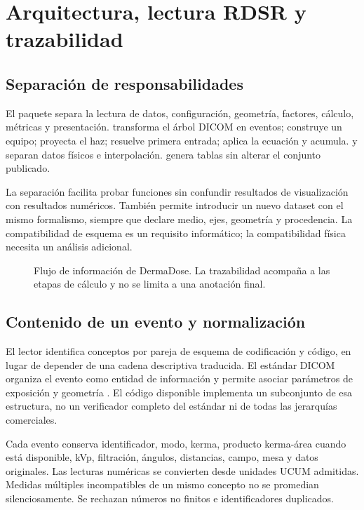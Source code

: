 \chapter{Arquitectura, lectura RDSR y trazabilidad}
\section{Separación de responsabilidades}
El paquete separa la lectura de datos, configuración, geometría, factores, cálculo, métricas y presentación.  transforma el árbol DICOM en eventos;  construye un equipo;  proyecta el haz;  resuelve primera entrada;  aplica la ecuación y acumula.  y  separan datos físicos e interpolación.  genera tablas sin alterar el conjunto publicado.

La separación facilita probar funciones sin confundir resultados de visualización con resultados numéricos. También permite introducir un nuevo dataset con el mismo formalismo, siempre que declare medio, ejes, geometría y procedencia. La compatibilidad de esquema es un requisito informático; la compatibilidad física necesita un análisis adicional.
\begin{figure}[htbp]\centering
\caption{Flujo de información de DermaDose. La trazabilidad acompaña a las etapas de cálculo y no se limita a una anotación final.}\end{figure}

\section{Contenido de un evento y normalización}
El lector identifica conceptos por pareja de esquema de codificación y código, en lugar de depender de una cadena descriptiva traducida. El estándar DICOM organiza el evento como entidad de información y permite asociar parámetros de exposición y geometría \citep{dicom}. El código disponible implementa un subconjunto de esa estructura, no un verificador completo del estándar ni de todas las jerarquías comerciales.

Cada evento conserva identificador, modo, kerma, producto kerma-área cuando está disponible, kVp, filtración, ángulos, distancias, campo, mesa y datos originales. Las lecturas numéricas se convierten desde unidades UCUM admitidas. Medidas múltiples incompatibles de un mismo concepto no se promedian silenciosamente. Se rechazan números no finitos e identificadores duplicados.

